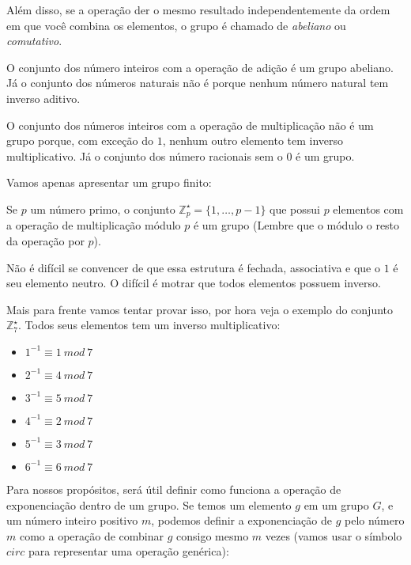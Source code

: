 Além disso, se a operação der o mesmo resultado independentemente da ordem em que você combina os elementos, o grupo é chamado de {\em abeliano} ou {\em comutativo}.

O conjunto dos número inteiros com a operação de adição é um grupo abeliano.
Já o conjunto dos números naturais não é porque nenhum número natural tem inverso aditivo.

O conjunto dos números inteiros com a operação de multiplicação não é um grupo porque, com exceção do $1$, nenhum outro elemento tem inverso multiplicativo.
Já o conjunto dos número racionais sem o $0$ é um grupo.

Vamos apenas apresentar um grupo finito:
\begin{example}
  Se $p$ um número primo, o conjunto $\mathbb{Z}_p^\star = \{ 1, \dots, p-1\}$ que possui $p$ elementos com a operação de multiplicação módulo $p$ é um grupo (Lembre que o módulo o resto da operação por $p$).

    Não é difícil se convencer de que essa estrutura é fechada, associativa e que o $1$ é seu elemento neutro.
    O difícil é motrar que todos elementos possuem inverso.

    Mais para frente vamos tentar provar isso, por hora veja o exemplo do conjunto $\mathbb{Z}_7^\star$.
    Todos seus elementos tem um inverso multiplicativo:
    
    \begin{multicols}{2}
    \begin{itemize}
      \item[] $1^{-1} \equiv 1\ mod\ 7$
      \item[] $2^{-1} \equiv 4\ mod\ 7$
      \item[] $3^{-1} \equiv 5\ mod\ 7$
    \end{itemize}
    \begin{itemize}
      \item[] $4^{-1} \equiv 2\ mod\ 7$
      \item[] $5^{-1} \equiv 3\ mod\ 7$
      \item[] $6^{-1} \equiv 6\ mod\ 7$
    \end{itemize}
  \end{multicols}
\end{example}

Para nossos propósitos, será útil definir como funciona a operação de exponenciação dentro de um grupo.
Se temos um elemento $g$ em um grupo $G$, e um número inteiro positivo $m$, podemos definir a exponenciação de $g$ pelo número $m$ como a operação de combinar $g$ consigo mesmo $m$ vezes (vamos usar o símbolo $circ$ para representar uma operação genérica):

